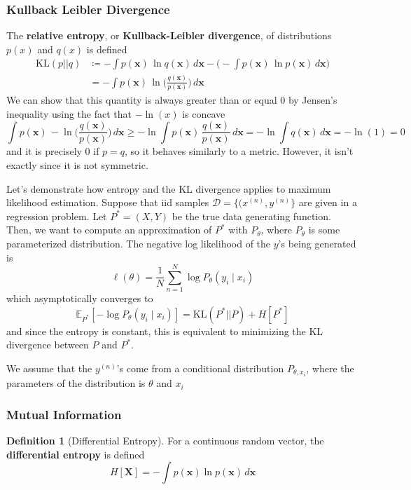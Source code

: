 \documentclass{article}
\theoremstyle{definition}
\theoremstyle{remark}
\theoremstyle{definition}
\newtheorem{definition}{Definition}[section]
\begin{document}
\subsubsection{Kullback Leibler Divergence}

The \textbf{relative entropy}, or \textbf{Kullback-Leibler divergence}, of distributions $p(x)$ and $q(x)$ is defined 
\begin{align*}
    \mathrm{KL}(p || q) & \coloneqq - \int p(\mathbf{x}) \, \ln{q(\mathbf{x})} \,d\mathbf{x} - \bigg( - \int p(\mathbf{x}) \, \ln{p(\mathbf{x})} \,d\mathbf{x} \bigg) \\
    & = - \int p(\mathbf{x}) \, \ln \bigg( \frac{q(\mathbf{x})}{p(\mathbf{x})} \bigg) \,d\mathbf{x} 
\end{align*}
We can show that this quantity is always greater than or equal $0$ by Jensen's inequality using the fact that $-\ln(x)$ is concave
\[\int p(\mathbf{x}) \, -\ln \bigg( \frac{q(\mathbf{x})}{p(\mathbf{x})} \bigg) \,d\mathbf{x} \geq -\ln \int p(\mathbf{x}) \, \frac{q(\mathbf{x})}{p(\mathbf{x})} \,d\mathbf{x} = -\ln \int q(\mathbf{x}) \,d\mathbf{x} = -\ln(1) = 0\]
and it is precisely $0$ if $p = q$, so it behaves similarly to a metric. However, it isn't exactly since it is not symmetric. 

Let's demonstrate how entropy and the KL divergence applies to maximum likelihood estimation. Suppose that iid samples $\mathcal{D} = \{(x^{(n)}, y^{(n)}\}$ are given in a regression problem. Let $P^\ast = (X, Y)$ be the true data generating function. Then, we want to compute an approximation of $P^\ast$ with $P_\theta$, where $P_\theta$ is some parameterized distribution. The negative log likelihood of the $y$'s being generated is 
\[\ell(\theta) = \frac{1}{N} \sum_{n=1}^N \log P_\theta (y_i \mid x_i)\]
which asymptotically converges to 
\[\mathbb{E}_{P^\ast} [ -\log P_\theta (y_i \mid x_i)] = \mathrm{KL}(P^\ast || P) + H[P^\ast]\]
and since the entropy is constant, this is equivalent to minimizing the KL divergence between $P$ and $P^\ast$. 

We assume that the $y^{(n)}$'s come from a conditional distribution $P_{\theta, x_i}$, where the parameters of the distribution is $\theta$ and $x_i$ 


\subsubsection{Mutual Information}

\begin{definition}[Differential Entropy]
For a continuous random vector, the \textbf{differential entropy} is defined 
\[H[\mathbf{X}] = - \int p(\mathbf{x}) \ln{p(\mathbf{x})} \,d\mathbf{x}\]
\end{definition}
\end{document}
